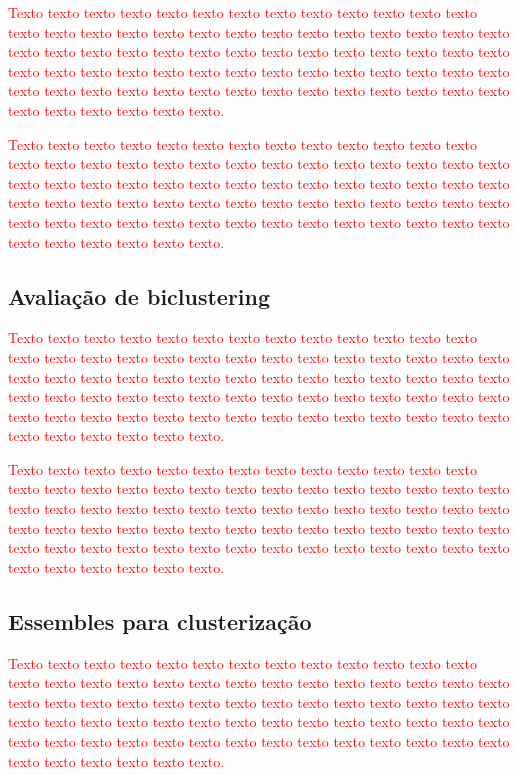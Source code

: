 \documentclass[normaltoc, espacoumemeio, pnumromarab,ruledheader]{abnt}
\begin{document}
	\textcolor{red}{Texto texto texto texto texto texto texto texto texto texto texto texto texto texto texto texto texto texto texto texto texto texto texto texto texto texto texto texto texto texto texto texto texto texto texto texto texto texto texto texto texto texto texto texto texto texto texto texto texto texto texto texto texto texto texto texto texto texto texto texto texto texto texto texto texto texto texto texto texto texto texto texto texto texto texto.}
	
	\textcolor{red}{Texto texto texto texto texto texto texto texto texto texto texto texto texto texto texto texto texto texto texto texto texto texto texto texto texto texto texto texto texto texto texto texto texto texto texto texto texto texto texto texto texto texto texto texto texto texto texto texto texto texto texto texto texto texto texto texto texto texto texto texto texto texto texto texto texto texto texto texto texto texto texto texto texto texto texto.}
	
	 \subsection{Avaliação de biclustering}
	
	\textcolor{red}{Texto texto texto texto texto texto texto texto texto texto texto texto texto texto texto texto texto texto texto texto texto texto texto texto texto texto texto texto texto texto texto texto texto texto texto texto texto texto texto texto texto texto texto texto texto texto texto texto texto texto texto texto texto texto texto texto texto texto texto texto texto texto texto texto texto texto texto texto texto texto texto texto texto texto texto.}
	
	\textcolor{red}{Texto texto texto texto texto texto texto texto texto texto texto texto texto texto texto texto texto texto texto texto texto texto texto texto texto texto texto texto texto texto texto texto texto texto texto texto texto texto texto texto texto texto texto texto texto texto texto texto texto texto texto texto texto texto texto texto texto texto texto texto texto texto texto texto texto texto texto texto texto texto texto texto texto texto texto.}

	 \subsection{Essembles para clusterização}

\textcolor{red}{Texto texto texto texto texto texto texto texto texto texto texto texto texto texto texto texto texto texto texto texto texto texto texto texto texto texto texto texto texto texto texto texto texto texto texto texto texto texto texto texto texto texto texto texto texto texto texto texto texto texto texto texto texto texto texto texto texto texto texto texto texto texto texto texto texto texto texto texto texto texto texto texto texto texto texto.}
\end{document}
